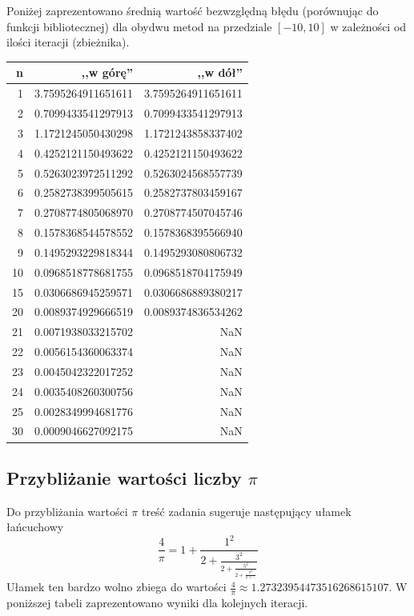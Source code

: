 \documentclass[11pt,leqno]{article}
\begin{document}
Poniżej zaprezentowano średnią wartość bezwzględną błędu (porównując do funkcji bibliotecznej) dla obydwu metod na przedziale $[-10, 10]$ w zależności od ilości iteracji (zbieżnika).

\begin{center}
\begin{tabular}{ r || r | r }
  \hline
  n & ,,w górę'' & ,,w dół''\\
  \hline \hline
  1 & 3.7595264911651611 & 3.7595264911651611 \\
  2 & 0.7099433541297913 & 0.7099433541297913 \\
  3 & 1.1721245050430298 & 1.1721243858337402 \\
  4 & 0.4252121150493622 & 0.4252121150493622 \\
  5 & 0.5263023972511292 & 0.5263024568557739 \\
  6 & 0.2582738399505615 & 0.2582737803459167 \\
  7 & 0.2708774805068970 & 0.2708774507045746 \\
  8 & 0.1578368544578552 & 0.1578368395566940 \\
  9 & 0.1495293229818344 & 0.1495293080806732 \\
  10 & 0.0968518778681755 & 0.0968518704175949 \\
  15 & 0.0306686945259571 & 0.0306686889380217 \\
  20 & 0.0089374929666519 & 0.0089374836534262 \\
  21 & 0.0071938033215702 & NaN \\
  22 & 0.0056154360063374 & NaN \\
  23 & 0.0045042322017252 & NaN \\
  24 & 0.0035408260300756 & NaN \\
  25 & 0.0028349994681776 & NaN \\
  30 & 0.0009046627092175 & NaN \\
\end{tabular}
\end{center}

\subsection{Przybliżanie wartości liczby $\pi$}
Do przybliżania wartości $\pi$ treść zadania sugeruje następujący ułamek łańcuchowy
\[
\frac{4}{\pi}
=
1 + \frac{1^2}{\displaystyle
  2 + \frac{3^2}{\displaystyle
    2 + \frac{5^2}{\displaystyle
      2 + \frac{7^2}{\displaystyle
        2 + \dots
      }
    }
  }
}
\]
Ułamek ten bardzo wolno zbiega do wartości $\frac{4}{\pi} \approx 1.27323954473516268615107$. W poniższej tabeli zaprezentowano wyniki dla kolejnych iteracji.
\end{document}
